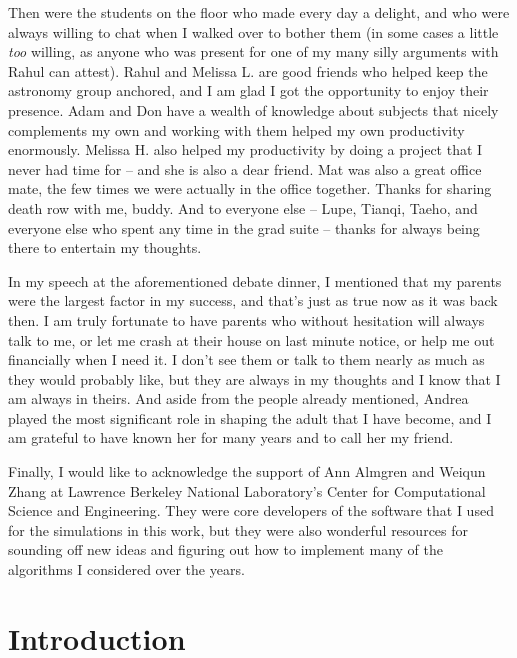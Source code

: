 \documentclass[12pt]{article}
\begin{document}
Then were the students on the floor who made every day a delight, and who
were always willing to chat when I walked over to bother them (in some cases
a little \textit{too} willing, as anyone who was present for one of my many
silly arguments with Rahul can attest). Rahul and Melissa L. are good friends 
who helped keep the astronomy group anchored, and I am glad I got the 
opportunity to enjoy their presence. Adam and Don have a wealth of knowledge 
about subjects that nicely complements my own and working with them helped my 
own productivity enormously. Melissa H. also helped my productivity by doing 
a project that I never had time for -- and she is also a dear friend. Mat 
was also a great office mate, the few times we were actually in the office 
together. Thanks for sharing death row with me, buddy. And to everyone else
-- Lupe, Tianqi, Taeho, and everyone else who spent any time in the grad 
suite -- thanks for always being there to entertain my thoughts.

In my speech at the aforementioned debate dinner, I mentioned that my 
parents were the largest factor in my success, and that's just as true 
now as it was back then. I am truly fortunate to have parents who without 
hesitation will always talk to me, or let me crash at their house on 
last minute notice, or help me out financially when I need it. I don't 
see them or talk to them nearly as much as they would probably like, 
but they are always in my thoughts and I know that I am always in theirs.
And aside from the people already mentioned, Andrea played the most significant 
role in shaping the adult that I have become, and I am grateful to have known 
her for many years and to call her my friend.

Finally, I would like to acknowledge the support of Ann Almgren and Weiqun 
Zhang at Lawrence Berkeley National Laboratory's Center for Computational 
Science and Engineering. They were core developers of the software that 
I used for the simulations in this work, but they were also wonderful resources 
for sounding off new ideas and figuring out how to implement many of the 
algorithms I considered over the years.

\newpage
{}
\section{Introduction}
\end{document}
